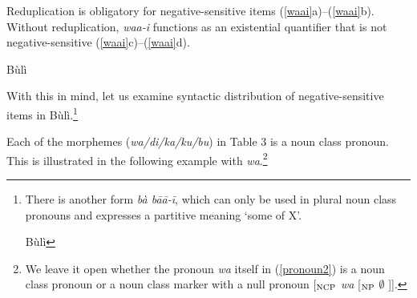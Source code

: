 \documentclass[output=paper,colorlinks,citecolor=brown]{langscibook}
\begin{document}
\z

Reduplication is obligatory for negative-sensitive items (\ref{waai}a)--(\ref{waai}b). Without reduplication, \textit{waa-i} functions as an existential quantifier that is not negative-sensitive (\ref{waai}c)--(\ref{waai}d).


\ea Bùlì \label{waai}
\z
\z

With this in mind, let us examine syntactic distribution of negative-sensitive items in Bùlì.\footnote{There is another form \textit{bà bāā-ī}, which can only be used in plural noun class pronouns and expresses a partitive meaning `some of X'.


\ea Bùlì
\z
\z
}


Each of the morphemes (\textit{wa/di/ka/ku/bu}) in Table 3 is a noun class pronoun. This is illustrated in the following example with \textit{wa}.\footnote{We leave it open whether the pronoun \textit{wa} itself in (\ref{pronoun2}) is a noun class pronoun or a noun class marker with a null pronoun [$_{\textup{NCP}}$ \textit{wa} [$_{\textup{NP}}$ $\emptyset$ ]].}
\end{document}

